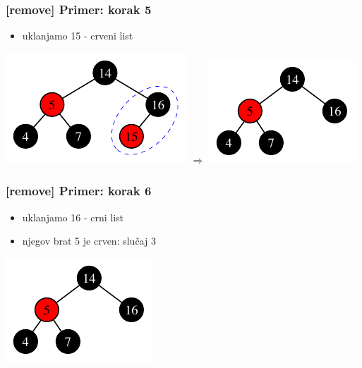 \documentclass[compress,aspectratio=169]{beamer}
\begin{document}
\begin{frame}[fragile]
  \frametitle{[remove] Primer: korak 5}
  \begin{itemize}
    \item uklanjamo 15 - crveni list
  \end{itemize}
  \begin{center}
    \includegraphics[scale=0.8]{asp-11-del-07.pdf} $\Rightarrow$
    \includegraphics[scale=0.8]{asp-11-del-08.pdf}
  \end{center}
\end{frame}

\begin{frame}[fragile]
  \frametitle{[remove] Primer: korak 6}
  \begin{itemize}
    \item uklanjamo 16 - crni list
    \item njegov brat 5 je crven: slučaj 3
  \end{itemize}
  \begin{center}
    \includegraphics[scale=0.8]{asp-11-del-08.pdf}
  \end{center}
\end{frame}
\end{document}
